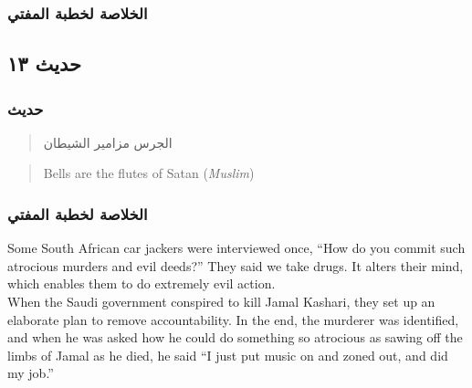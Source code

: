\documentclass[
]{book}
\begin{document}
\begin{quote}
\end{quote}

\hypertarget{ux627ux644ux62eux644ux627ux635ux629-ux644ux62eux637ux628ux629-ux627ux644ux645ux641ux62aux64a-11}{%
\subsubsection{الخلاصة لخطبة المفتي}\label{ux627ux644ux62eux644ux627ux635ux629-ux644ux62eux637ux628ux629-ux627ux644ux645ux641ux62aux64a-11}}

\hypertarget{ux62dux62fux64aux62b-ux661ux663}{%
\subsection{حديث ١٣}\label{ux62dux62fux64aux62b-ux661ux663}}

\hypertarget{ux62dux62fux64aux62b-13}{%
\subsubsection{حديث}\label{ux62dux62fux64aux62b-13}}

\begin{quote}
الجرس مزامير الشيطان
\end{quote}

\begin{quote}
Bells are the flutes of Satan (\emph{Muslim})
\end{quote}

\hypertarget{ux627ux644ux62eux644ux627ux635ux629-ux644ux62eux637ux628ux629-ux627ux644ux645ux641ux62aux64a-12}{%
\subsubsection{الخلاصة لخطبة المفتي}\label{ux627ux644ux62eux644ux627ux635ux629-ux644ux62eux637ux628ux629-ux627ux644ux645ux641ux62aux64a-12}}

Some South African car jackers were interviewed once, ``How do you commit such atrocious murders and evil deeds?'' They said we take drugs. It alters their mind, which enables them to do extremely evil action.\\
When the Saudi government conspired to kill Jamal Kashari, they set up an elaborate plan to remove accountability. In the end, the murderer was identified, and when he was asked how he could do something so atrocious as sawing off the limbs of Jamal as he died, he said ``I just put music on and zoned out, and did my job.''
\end{document}
